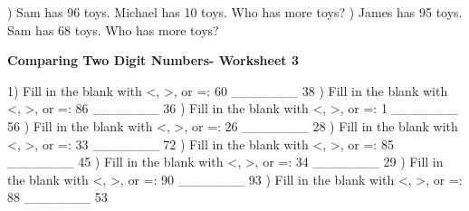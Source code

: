 \documentclass{article}%
\begin{document}
) Sam has 96 toys. Michael has 10 toys. Who has more toys?%
\newline%
\newline%
) James has 95 toys. Sam has 68 toys. Who has more toys?%
\newline%
\newline%
\newline%
\pagebreak%
\large%
\begin{center}%
\textbf{Comparing Two Digit Numbers- Worksheet 3}%
\newline%
\newline%
\newline%
\end{center} \normalsize%
1) Fill in the blank with <, >, or =: 60 \_\_\_\_\_\_\_ 38%
\newline%
\newline%
) Fill in the blank with <, >, or =: 86 \_\_\_\_\_\_\_ 36%
\newline%
\newline%
) Fill in the blank with <, >, or =: 1 \_\_\_\_\_\_\_ 56%
\newline%
\newline%
) Fill in the blank with <, >, or =: 26 \_\_\_\_\_\_\_ 28%
\newline%
\newline%
) Fill in the blank with <, >, or =: 33 \_\_\_\_\_\_\_ 72%
\newline%
\newline%
) Fill in the blank with <, >, or =: 85 \_\_\_\_\_\_\_ 45%
\newline%
\newline%
) Fill in the blank with <, >, or =: 34 \_\_\_\_\_\_\_ 29%
\newline%
\newline%
) Fill in the blank with <, >, or =: 90 \_\_\_\_\_\_\_ 93%
\newline%
\newline%
) Fill in the blank with <, >, or =: 88 \_\_\_\_\_\_\_ 53%
\newline%
\end{document}
